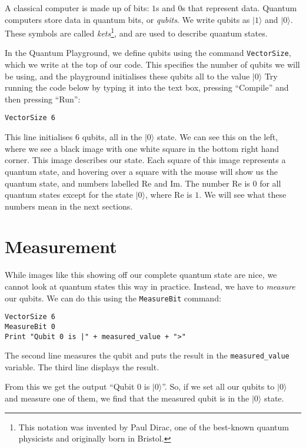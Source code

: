 \documentclass[twocolumn]{article}
\begin{document}
A classical computer is made up of bits: $1$s and $0$s that represent data. Quantum computers store data in quantum bits, or {\em qubits}. We write qubits as $|1\rangle$ and $|0\rangle$. These symbols are called {\em kets}\footnote{This notation was invented by Paul Dirac, one of the best-known quantum physicists and originally born in Bristol.}, and are used to describe quantum states.

In the Quantum Playground, we define qubits using the command \texttt{VectorSize}, which we write at the top of our code. This specifies the number of qubits we will be using, and the playground initialises these qubits all to the value $|0\rangle$ Try running the code below by typing it into the text box, pressing ``Compile'' and then pressing ``Run'':

\begin{lstlisting}
VectorSize 6
\end{lstlisting}

This line initialises $6$ qubits, all in the $|0\rangle$ state. We can see this on the left, where we see a black image with one white square in the bottom right hand corner. This image describes our state. Each square of this image represents a quantum state, and hovering over a square with the mouse will show us the quantum state, and numbers labelled Re and Im. The number Re is $0$ for all quantum states except for the state $|0\rangle$, where Re is $1$. We will see what these numbers mean in the next sections.

\section{Measurement}

While images like this showing off our complete quantum state are nice, we cannot look at quantum states this way in practice. Instead, we have to {\em measure} our qubits. We can do this using the \texttt{MeasureBit} command:

\begin{lstlisting}
VectorSize 6
MeasureBit 0
Print "Qubit 0 is |" + measured_value + ">"
\end{lstlisting}

The second line measures the qubit and puts the result in the \texttt{measured\_value} variable. The third line displays the result.

From this we get the output ``Qubit $0$ is $|0\rangle$''. So, if we set all our qubits to $|0\rangle$ and measure one of them, we find that the measured qubit is in the $|0\rangle$ state.
\end{document}
